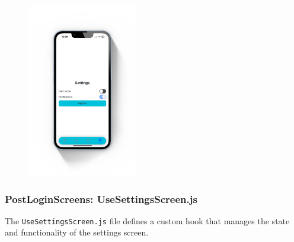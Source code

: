\begin{figure}[!ht]
    \centering
    \includegraphics[width=0.43\textwidth]{LATEX/Appendices/Images/Software/Frontend/settings_screen.png}
    \label{fig:settings screen}
\end{figure}

\subsubsection{PostLoginScreens: UseSettingsScreen.js}

The \texttt{UseSettingsScreen.js} file defines a custom hook that manages the state and functionality of the settings screen.

